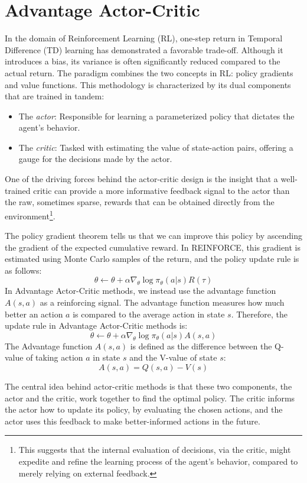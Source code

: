 \section{Advantage Actor-Critic}
In the domain of Reinforcement Learning (RL), one-step return in Temporal Difference (TD) learning has demonstrated a favorable trade-off. Although it introduces a bias, its variance is often significantly reduced compared to the actual return. The  paradigm combines the two concepts in RL: policy gradients and value functions. This methodology is characterized by its dual components that are trained in tandem:
\begin{itemize}
    \item The \textit{actor}: Responsible for learning a parameterized policy that dictates the agent's behavior.
    \item The \textit{critic}: Tasked with estimating the value of state-action pairs, offering a gauge for the decisions made by the actor.
\end{itemize}
One of the driving forces behind the actor-critic design is the insight that a well-trained critic can provide a more informative feedback signal to the actor than the raw, sometimes sparse, rewards that can be obtained directly from the environment\footnote{This suggests that the internal evaluation of decisions, via the critic, might expedite and refine the learning process of the agent's behavior, compared to merely relying on external feedback.}.

The policy gradient theorem tells us that we can improve this policy by ascending the gradient of the expected cumulative reward. In REINFORCE, this gradient is estimated using Monte Carlo samples of the return, and the policy update rule is as follows:
    \[\theta \leftarrow \theta + \alpha \nabla_{\theta} \log \pi_{\theta}(a|s) R(\tau)\]
In Advantage Actor-Critic methods, we instead use the advantage function $A(s, a)$ as a reinforcing signal. The advantage function measures how much better an action $a$ is compared to the average action in state $s$. Therefore, the update rule in Advantage Actor-Critic methods is:
\[\theta \leftarrow \theta + \alpha \nabla_{\theta} \log \pi_{\theta}(a|s) A(s, a)\]
The Advantage function $A(s,a)$ is defined as the difference between the Q-value of taking action $a$ in state $s$ and the V-value of state $s$:
$$A(s, a) = Q(s, a) - V(s)$$

The central idea behind actor-critic methods is that these two components, the actor and the critic, work together to find the optimal policy. The critic informs the actor how to update its policy, by evaluating the chosen actions, and the actor uses this feedback to make better-informed actions in the future.

